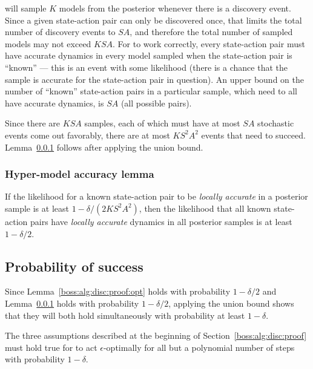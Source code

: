  will sample $K$ models from the posterior whenever there is a discovery event. Since a given state-action pair can only be discovered once, that limits the total number of discovery events to $S A$, and therefore the total number of sampled models may not exceed $K S A$. For  to work correctly, every state-action pair must have accurate dynamics in every model sampled when the state-action pair is ``known'' --- this is an event with some likelihood (there is a chance that the sample is accurate for the state-action pair in question). An upper bound on the number of ``known'' state-action pairs in a particular sample, which need to all have accurate dynamics, is $S A$ (all possible pairs).

Since there are $K S A$ samples, each of which must have at most $S A$ stochastic events come out favorably, there are at most $K S^2 A^2$ events that need to succeed. Lemma~\ref{boss:alg:disc:proof:acc} follows after applying the union bound.

\subsubsection{Hyper-model accuracy lemma}
\label{boss:alg:disc:proof:acc}
If the likelihood for a known state-action pair to be \emph{locally accurate} in a posterior sample is at least $1-\delta/(2 K S^2 A^2)$, then the likelihood that all known state-action pairs have \emph{locally accurate} dynamics in all posterior samples is at least $1-\delta/2$.

\subsection{Probability of success}

Since Lemma~\ref{boss:alg:disc:proof:opt} holds with probability $1-\delta/2$ and Lemma~\ref{boss:alg:disc:proof:acc} holds with probability $1-\delta/2$, applying the union bound shows that they will both hold simultaneously with probability at least $1-\delta$.

The three assumptions described at the beginning of Section~\ref{boss:alg:disc:proof} must hold true for  to act $\epsilon$-optimally for all but a polynomial number of steps with probability $1-\delta$. 


